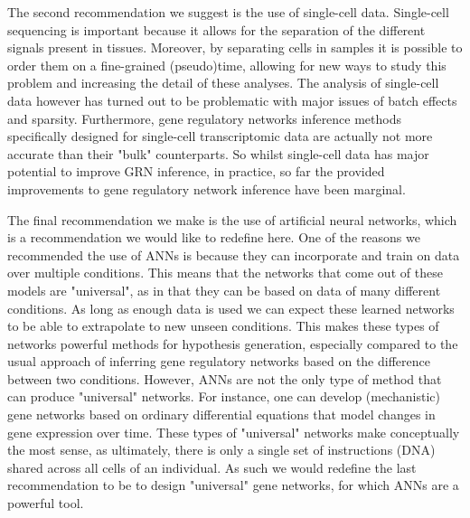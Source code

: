 The second recommendation we suggest is the use of single-cell data. Single-cell sequencing is important because it allows for the separation of the different signals present in tissues. Moreover, by separating cells in samples it is possible to order them on a fine-grained (pseudo)time\cite{Saelens2019}, allowing for new ways to study this problem and increasing the detail of these analyses. The analysis of single-cell data however has turned out to be problematic with major issues of batch effects \cite{Tran2020,Haghverdi2018,Lhnemann2020} and sparsity\cite{Lhnemann2020,Bouland2023}. Furthermore, gene regulatory networks inference methods specifically designed for single-cell transcriptomic data are actually not more accurate than their "bulk" counterparts\cite{Chen_2018}. So whilst single-cell data has major potential to improve GRN inference, in practice, so far the provided improvements to gene regulatory network inference have been marginal. 

The final recommendation we make is the use of artificial neural networks, which is a recommendation we would like to redefine here. One of the reasons we recommended the use of ANNs is because they can incorporate and train on data over multiple conditions. This means that the networks that come out of these models are "universal", as in that they can be based on data of many different conditions. As long as enough data is used we can expect these learned networks to be able to extrapolate to new unseen conditions\cite{Schreiber2020_avocado}. This makes these types of networks powerful methods for hypothesis generation, especially compared to the usual approach of inferring gene regulatory networks based on the difference between two conditions. However, ANNs are not the only type of method that can produce "universal" networks. For instance, one can develop (mechanistic) gene networks based on ordinary differential equations that model changes in gene expression over time\cite{Ventre_2022}. These types of "universal" networks make conceptually the most sense, as ultimately, there is only a single set of instructions (DNA) shared across all cells of an individual. As such we would redefine the last recommendation to be to design "universal" gene networks, for which ANNs are a powerful tool.

